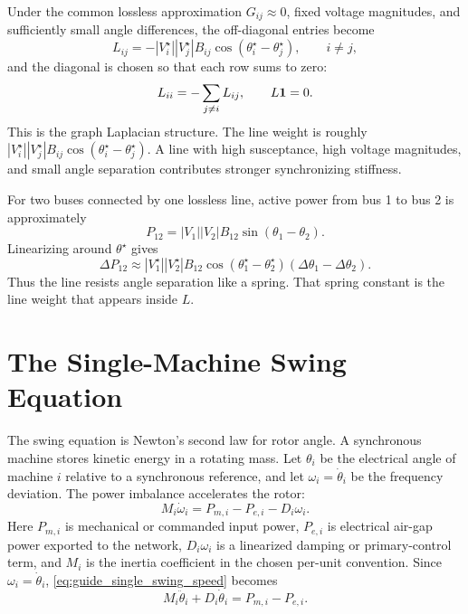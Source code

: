 Under the common lossless approximation \(G_{ij}\approx0\), fixed voltage
magnitudes, and sufficiently small angle differences, the off-diagonal
entries become
\begin{equation}
  L_{ij}
  =
  -|V_i^\star||V_j^\star|B_{ij}
  \cos(\theta_i^\star-\theta_j^\star),
  \qquad i\ne j,
  \label{eq:guide_L_offdiag}
\end{equation}
and the diagonal is chosen so that each row sums to zero:
\begin{equation}
  L_{ii}=-\sum_{j\ne i}L_{ij},
  \qquad
  L\mathbf 1=0.
  \label{eq:guide_L_rowsum}
\end{equation}
This is the graph Laplacian structure. The line weight is roughly
\(|V_i^\star||V_j^\star|B_{ij}\cos(\theta_i^\star-\theta_j^\star)\). A line
with high susceptance, high voltage magnitudes, and small angle separation
contributes stronger synchronizing stiffness.

\begin{example}
For two buses connected by one lossless line, active power from bus 1 to bus 2
is approximately
\[
  P_{12}=|V_1||V_2|B_{12}\sin(\theta_1-\theta_2).
\]
Linearizing around \(\theta^\star\) gives
\[
  \Delta P_{12}
  \approx
  |V_1^\star||V_2^\star|B_{12}
  \cos(\theta_1^\star-\theta_2^\star)
  (\Delta\theta_1-\Delta\theta_2).
\]
Thus the line resists angle separation like a spring. That spring constant is
the line weight that appears inside \(L\).
\end{example}

\section{The Single-Machine Swing Equation}

The swing equation is Newton's second law for rotor angle. A synchronous
machine stores kinetic energy in a rotating mass. Let \(\theta_i\) be the
electrical angle of machine \(i\) relative to a synchronous reference, and let
\(\omega_i=\dot\theta_i\) be the frequency deviation. The power imbalance
accelerates the rotor:
\begin{equation}
  M_i\dot\omega_i
  =
  P_{m,i}-P_{e,i}-D_i\omega_i.
  \label{eq:guide_single_swing_speed}
\end{equation}
Here \(P_{m,i}\) is mechanical or commanded input power, \(P_{e,i}\) is
electrical air-gap power exported to the network, \(D_i\omega_i\) is a
linearized damping or primary-control term, and \(M_i\) is the inertia
coefficient in the chosen per-unit convention. Since \(\omega_i=\dot\theta_i\),
\eqref{eq:guide_single_swing_speed} becomes
\begin{equation}
  M_i\ddot\theta_i+D_i\dot\theta_i
  =
  P_{m,i}-P_{e,i}.
  \label{eq:guide_single_swing_angle}
\end{equation}

